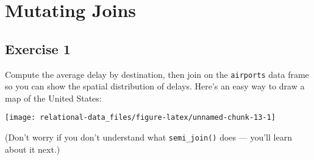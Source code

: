 \documentclass[]{book}
\newenvironment{Shaded}{\begin{snugshade}}{\end{snugshade}}
\newcommand{\CommentTok}[1]{\textcolor[rgb]{0.56,0.35,0.01}{\textit{#1}}}
\newcommand{\KeywordTok}[1]{\textcolor[rgb]{0.13,0.29,0.53}{\textbf{#1}}}
\newcommand{\NormalTok}[1]{#1}
\newcommand{\OperatorTok}[1]{\textcolor[rgb]{0.81,0.36,0.00}{\textbf{#1}}}
\newcommand{\StringTok}[1]{\textcolor[rgb]{0.31,0.60,0.02}{#1}}
\theoremstyle{definition}
\theoremstyle{definition}
\theoremstyle{definition}
\theoremstyle{remark}
\begin{document}
\hypertarget{mutating-joins}{%
\section{Mutating Joins}\label{mutating-joins}}

\begin{Shaded}
\end{Shaded}

\hypertarget{exercise-1-23}{%
\subsection{Exercise 1}\label{exercise-1-23}}

Compute the average delay by destination, then join on the
\texttt{airports} data frame so you can show the spatial distribution of
delays. Here's an easy way to draw a map of the United States:

\begin{Shaded}
\end{Shaded}

\begin{center}\texttt{[image: relational-data\_files/figure-latex/unnamed-chunk-13-1]} \end{center}

(Don't worry if you don't understand what \texttt{semi\_join()} does ---
you'll learn about it next.)
\end{document}
